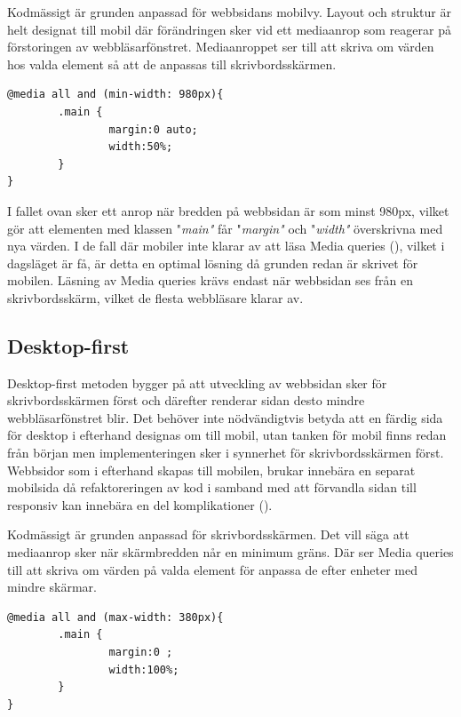 \documentclass[11pt]{article}
\begin{document}
Kodmässigt är grunden anpassad för webbsidans mobilvy. Layout och struktur är helt designat till mobil där förändringen sker vid ett mediaanrop som reagerar på förstoringen av webbläsarfönstret. Mediaanroppet ser till att skriva om värden hos valda element så att de anpassas till skrivbordsskärmen.
 
\vspace{0.5cm}
 \begin{verbatim}
@media all and (min-width: 980px){
        .main {
                margin:0 auto;
                width:50%;
        }
}
\end{verbatim}

\vspace{0.5cm}
I fallet ovan sker ett anrop när bredden på webbsidan är som minst 980px, vilket gör att elementen med klassen "\textit{main"} får "\textit{margin"} och "\textit{width"} överskrivna med nya värden. I de fall där mobiler inte klarar av att läsa Media queries (\cite{adaptiveresp}), vilket i dagsläget är få, är detta en optimal lösning då grunden redan är skrivet för mobilen. Läsning av Media queries krävs endast när webbsidan ses från en skrivbordsskärm, vilket de flesta webbläsare klarar av.

\subsection{Desktop-first}
Desktop-first metoden bygger på att utveckling av webbsidan sker för skrivbordsskärmen först och därefter renderar sidan desto mindre webbläsarfönstret blir. Det behöver inte nödvändigtvis betyda att en färdig sida för desktop i efterhand designas om till mobil, utan tanken för mobil finns redan från början men implementeringen sker i synnerhet för skrivbordsskärmen först. Webbsidor som i efterhand skapas till mobilen, brukar innebära en separat mobilsida då refaktoreringen av kod i samband med att förvandla sidan till responsiv kan innebära en del komplikationer (\cite{adaptiveresp}).  

Kodmässigt är grunden anpassad för skrivbordsskärmen. Det vill säga att mediaanrop sker när skärmbredden når en minimum gräns. Där ser Media queries till att skriva om värden på valda element för anpassa de efter enheter med mindre skärmar.


\vspace{0.5cm}
 \begin{verbatim}
@media all and (max-width: 380px){
        .main {
                margin:0 ;
                width:100%;
        }
}
\end{verbatim}
\vspace{0.5cm}
\end{document}

